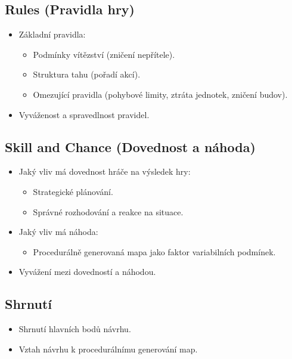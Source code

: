 \subsection{Rules (Pravidla hry)}
\begin{itemize}
    \item Základní pravidla:
    \begin{itemize}
        \item Podmínky vítězství (zničení nepřítele).
        \item Struktura tahu (pořadí akcí).
        \item Omezující pravidla (pohybové limity, ztráta jednotek, zničení budov).
    \end{itemize}
    \item Vyváženost a spravedlnost pravidel.
\end{itemize}


\subsection{Skill and Chance (Dovednost a náhoda)}
\begin{itemize}
    \item Jaký vliv má dovednost hráče na výsledek hry:
    \begin{itemize}
        \item Strategické plánování.
        \item Správné rozhodování a reakce na situace.
    \end{itemize}
    \item Jaký vliv má náhoda:
    \begin{itemize}
        \item Procedurálně generovaná mapa jako faktor variabilních podmínek.
    \end{itemize}
    \item Vyvážení mezi dovedností a náhodou.
\end{itemize}


\subsection{Shrnutí}
\begin{itemize}
    \item Shrnutí hlavních bodů návrhu.
    \item Vztah návrhu k procedurálnímu generování map.
\end{itemize}
